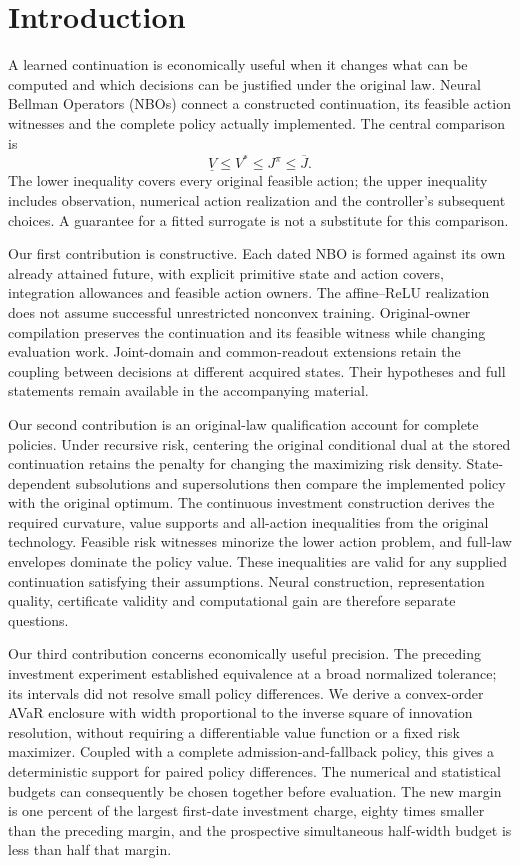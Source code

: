 \section{Introduction}\label{sec:introduction65}
A learned continuation is economically useful when it changes what can be computed and which decisions can be justified under the original law. Neural Bellman Operators (NBOs) connect a constructed continuation, its feasible action witnesses and the complete policy actually implemented. The central comparison is
\[
 \underline V\leq V^*\leq J^{\widehat\pi}\leq\overline J.
\]
The lower inequality covers every original feasible action; the upper inequality includes observation, numerical action realization and the controller's subsequent choices. A guarantee for a fitted surrogate is not a substitute for this comparison.

Our first contribution is constructive. Each dated NBO is formed against its own already attained future, with explicit primitive state and action covers, integration allowances and feasible action owners. The affine--ReLU realization does not assume successful unrestricted nonconvex training. Original-owner compilation preserves the continuation and its feasible witness while changing evaluation work. Joint-domain and common-readout extensions retain the coupling between decisions at different acquired states. Their hypotheses and full statements remain available in the accompanying material.

Our second contribution is an original-law qualification account for complete policies. Under recursive risk, centering the original conditional dual at the stored continuation retains the penalty for changing the maximizing risk density. State-dependent subsolutions and supersolutions then compare the implemented policy with the original optimum. The continuous investment construction derives the required curvature, value supports and all-action inequalities from the original technology. Feasible risk witnesses minorize the lower action problem, and full-law envelopes dominate the policy value. These inequalities are valid for any supplied continuation satisfying their assumptions. Neural construction, representation quality, certificate validity and computational gain are therefore separate questions.

Our third contribution concerns economically useful precision. The preceding investment experiment established equivalence at a broad normalized tolerance; its intervals did not resolve small policy differences. We derive a convex-order AVaR enclosure with width proportional to the inverse square of innovation resolution, without requiring a differentiable value function or a fixed risk maximizer. Coupled with a complete admission-and-fallback policy, this gives a deterministic support for paired policy differences. The numerical and statistical budgets can consequently be chosen together before evaluation. The new margin is one percent of the largest first-date investment charge, eighty times smaller than the preceding margin, and the prospective simultaneous half-width budget is less than half that margin.

